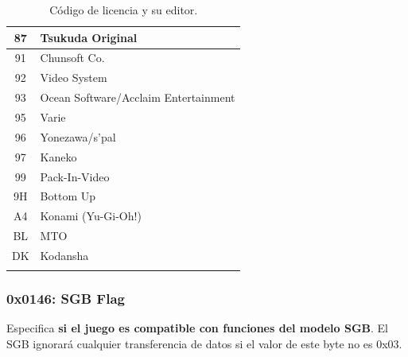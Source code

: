 \begin{longtable}{|c|l|}
87              & Tsukuda Original               \\ \hline
91              & Chunsoft Co.                   \\ \hline
92              & Video System                   \\ \hline
93              & Ocean Software/Acclaim Entertainment \\ \hline
95              & Varie                          \\ \hline
96              & Yonezawa/s’pal                 \\ \hline
97              & Kaneko                         \\ \hline
99              & Pack-In-Video                  \\ \hline
9H              & Bottom Up                      \\ \hline
A4              & Konami (Yu-Gi-Oh!)             \\ \hline
BL              & MTO                            \\ \hline
DK              & Kodansha                       \\ \hline
\caption{Código de licencia y su editor.} \\
\end{longtable}

\subsubsection{0x0146: SGB Flag}
Especifica \textbf{si el juego es compatible con funciones del modelo SGB}. El SGB ignorará cualquier transferencia de datos si el valor de este byte no es 0x03.


